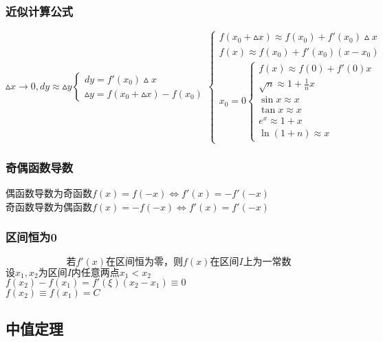 \subsubsection{近似计算公式}
\begin{center}
    $\vartriangle x\rightarrow 0, dy\approx \vartriangle y\begin{cases}
        dy=f'(x_0)\vartriangle x\\
        \vartriangle y=f(x_0+\vartriangle x)-f(x_0)
    \end{cases}\begin{cases}
        f(x_0+\vartriangle x)\approx f(x_0)+f'(x_0)\vartriangle x\\
        f(x)\approx f(x_0)+f'(x_0)(x-x_0)\\
        x_0=0\begin{cases}
            f(x)\approx f(0)+f'(0)x\\
            \sqrt{n}\approx 1+\frac{1}{n}x\\
            \sin x \approx x\\
            \tan x \approx x\\
            e^x \approx 1+x\\
            \ln(1+n)\approx x
        \end{cases}
    \end{cases}$\\
\end{center}
\subsubsection{奇偶函数导数}
\begin{center}
    偶函数导数为奇函数$f(x)=f(-x)\Leftrightarrow f'(x)=-f'(-x)$\\
    奇函数导数为偶函数$f(x)=-f(-x)\Leftrightarrow f'(x)=f'(-x)$
\end{center}
\subsubsection{区间恒为0}
$$\mbox{若}f'(x)\mbox{在区间恒为零，则}f(x)\mbox{在区间}I\mbox{上为一常数}$$
$\mbox{设}x_1,x_2\mbox{为区间}I\mbox{内任意两点}x_1<x_2$\\
$f(x_2)-f(x_1)=f'(\xi)(x_2-x_1)\equiv 0 $\\
$f(x_2)\equiv f(x_1)=C$
\subsection{中值定理}
